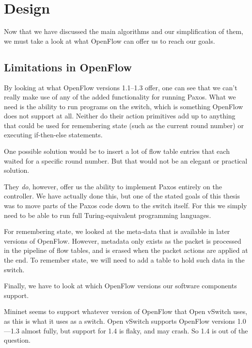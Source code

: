 \chapter{Design}
\label{chapter:design}

Now that we have discussed the main algorithms and our simplification of
them, we must take a look at what OpenFlow can offer us to reach our goals.



\section{Limitations in OpenFlow}

By looking at what OpenFlow versions 1.1--1.3 offer,
one can see that we can't really make use of any of the added functionality
for running Paxos.  What we need is the ability to run programs on the
switch, which is something OpenFlow does not support at all.  Neither do
their action primitives add up to anything that could be used for
remembering state (such as the current round number) or executing
if-then-else statements.

One possible solution would be to insert a lot of flow table entries that
each waited for a specific round number.  But that would not be an elegant
or practical solution.

They \textit{do}, however, offer us the ability to implement Paxos entirely
on the controller.  We have actually done this, but one of the stated goals
of this thesis was to move parts of the Paxos code down to the switch
itself.  For this we simply need to be able to run full Turing-equivalent
programming languages.

For remembering state, we looked at the meta-data
that is available in later versions of OpenFlow.  However, metadata only
exists as the packet is processed in the pipeline of flow tables, and is
erased when the packet actions are applied at the end.  To remember state,
we will need to add a table to hold such data in the switch.

Finally, we have to look at which OpenFlow versions our software components
support.

Mininet seems to support whatever version of OpenFlow that Open vSwitch uses,
as this is what it uses as a switch.  Open vSwitch
supports OpenFlow versions 1.0---1.3
almost fully, but support for 1.4 is flaky, and may crash.  So 1.4 is out of the question.

